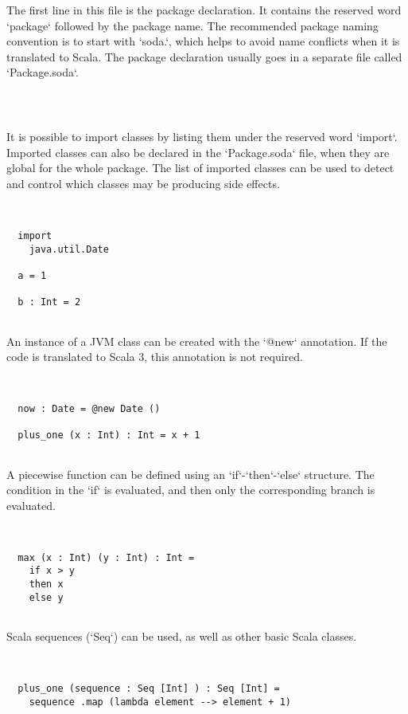\documentclass[12pt,a4paper]{article}
\begin{document}
The first line in this file is the package declaration. It contains the reserved word
`package` followed by the package name. The recommended package naming convention is to
start with `soda.`, which helps to avoid name conflicts when it is translated to Scala.
The package declaration usually goes in a separate file called `Package.soda`.


\begin{lstlisting}



\end{lstlisting}

It is possible to import classes by listing them under the reserved word `import`.
Imported classes can also be declared in the `Package.soda` file, when they are global
for the whole package. The list of imported classes can be used to detect and control which
classes may be producing side effects.


\begin{lstlisting}


  import
    java.util.Date

  a = 1

  b : Int = 2


\end{lstlisting}

An instance of a JVM class can be created with the `@new` annotation. If the code is
translated to Scala 3, this annotation is not required.


\begin{lstlisting}


  now : Date = @new Date ()

  plus_one (x : Int) : Int = x + 1


\end{lstlisting}

A piecewise function can be defined using an `if`-`then`-`else` structure. The condition in
the `if` is evaluated, and then only the corresponding branch is evaluated.


\begin{lstlisting}


  max (x : Int) (y : Int) : Int =
    if x > y
    then x
    else y


\end{lstlisting}

Scala sequences (`Seq`) can be used, as well as other basic Scala classes.


\begin{lstlisting}


  plus_one (sequence : Seq [Int] ) : Seq [Int] =
    sequence .map (lambda element --> element + 1)


\end{lstlisting}
\end{document}
